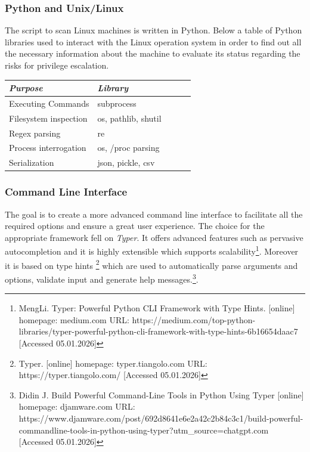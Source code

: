 \subsubsection{Python and Unix/Linux}

The script to scan Linux machines is written in Python. Below a table of Python libraries used to interact with the Linux operation system in order to find out all the necessary information about the machine to evaluate its status regarding the risks for privilege escalation. \newline

\begin{tabular}{@{} *5l @{}}    \toprule
\emph{Purpose} & \emph{Library}   \\\midrule
Executing Commands & subprocess \\
Filesystem inspection & os, pathlib, shutil \\
Regex parsing & re \\
Process interrogation & os, /proc parsing \\
Serialization & json, pickle, csv\\\bottomrule
 \hline
\end{tabular}

\subsubsection{Command Line Interface}

The goal is to create a more advanced command line interface to facilitate all the required options and ensure a great user experience. The choice for the appropriate framework fell on \textit{Typer}. It offers advanced features such as pervasive autocompletion and it is highly extensible which supports scalability\footnote{MengLi. Typer: Powerful Python CLI Framework with Type Hints. [online] homepage: medium.com URL: https://medium.com/top-python-libraries/typer-powerful-python-cli-framework-with-type-hints-6b16654daac7 [Accessed 05.01.2026]}. Moreover it is based on type hints \footnote{Typer. [online] homepage: typer.tiangolo.com URL: https://typer.tiangolo.com/ [Accessed 05.01.2026]} which are used to automatically parse arguments and options, validate input and generate help messages.\footnote{Didin J. Build Powerful Command-Line Tools in Python Using Typer [online] homepage: djamware.com URL: https://www.djamware.com/post/692d8641e6e2a42c2b84c3c1/build-powerful-commandline-tools-in-python-using-typer?utm\_source=chatgpt.com [Accessed 05.01.2026]}.

